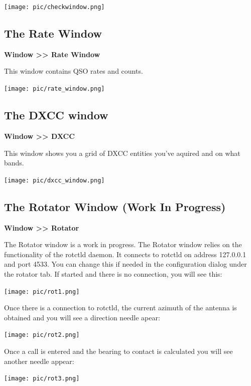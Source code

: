 \documentclass{article}
\begin{document}
\vspace{0.5cm}
\texttt{[image: pic/checkwindow.png]}
\newpage
\subsection{The Rate Window}

\textbf{Window >> Rate Window}

This window contains QSO rates and counts.

\vspace{0.5cm}
\texttt{[image: pic/rate\_window.png]}

\subsection{The DXCC window}
\textbf{Window >> DXCC}

This window shows you a grid of DXCC entities you've aquired and on what bands.

\vspace{0.5cm}
\texttt{[image: pic/dxcc\_window.png]}

\subsection{The Rotator Window (Work In Progress)}
\textbf{Window >> Rotator}

The Rotator window is a work in progress. The Rotator window relies on the functionality of the rotctld daemon. It connects to rotctld on address 127.0.0.1 and port 4533. You can change this if needed in the configuration dialog under the rotator tab. If started and there is no connection, you will see this:

\vspace{0.5cm}
\texttt{[image: pic/rot1.png]}
\vspace{0.5cm}

Once there is a connection to rotctld, the current azimuth of the antenna is obtained and you will see a direction needle apear:

\vspace{0.5cm}
\texttt{[image: pic/rot2.png]}
\vspace{0.5cm}

Once a call is entered and the bearing to contact is calculated you will see another needle appear:

\vspace{0.5cm}
\texttt{[image: pic/rot3.png]}
\vspace{0.5cm}
\end{document}
